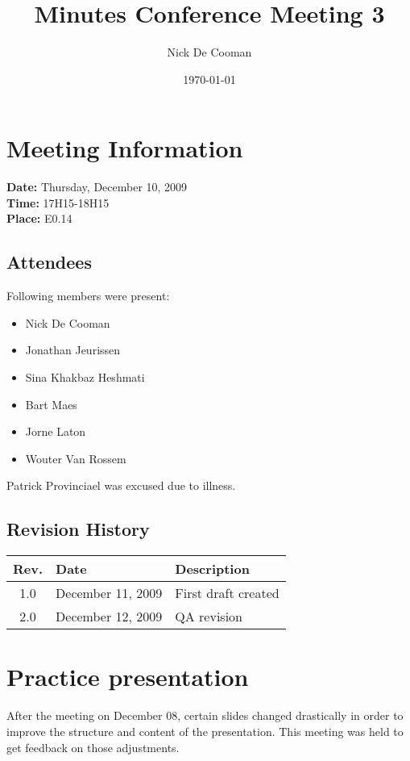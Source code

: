 \documentclass[a4paper, 12pt]{article}
\begin{document}
\title{Minutes Conference Meeting 3}
\author{Nick De Cooman}
\date{\today}

\maketitle	
	\section{Meeting Information}
		\textbf{Date:} Thursday, December 10, 2009\\
		\textbf{Time:} 17H15-18H15\\
		\textbf{Place:} E0.14\\
		
		\subsection{Attendees}
Following members were present:
			\begin{itemize}
				\item Nick De Cooman
				\item Jonathan Jeurissen
				\item Sina Khakbaz Heshmati
				\item Bart Maes
				\item Jorne Laton
				\item Wouter Van Rossem
			\end{itemize}
Patrick Provinciael was excused due to illness.
			
		\subsection{Revision History}
			\begin{tabular}{c | l | l }
				\textbf{Rev.} & \textbf{Date} & \textbf{Description} \\
				\hline
				1.0 & December 11, 2009 & First draft created \\
				2.0 & December 12, 2009 & QA revision \\

			\end{tabular}		

\section{Practice presentation}

After the meeting on December 08, certain slides changed drastically in order to improve the structure and content of the presentation. This meeting was held to get feedback on those adjustments. 
\end{document}

